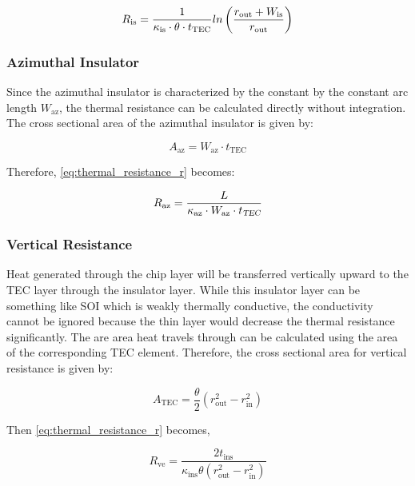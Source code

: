 \documentclass[10pt,a4paper,twocolumn]{article}
\begin{document}
\begin{equation}
	R_{\text{is}} = \frac{1}{\kappa_{\text{is}} \cdot \theta \cdot t_{\text{TEC}}} \\ln\left( \frac{r_{\text{out}} + W_{\text{is}}}{r_{\text{out}}} \right)
	\label{eq:radial_ins_resistance}
\end{equation}

\subsubsection{Azimuthal Insulator}

Since the azimuthal insulator is characterized by the constant by the constant arc length $W_{\text{az}}$, the thermal resistance can be calculated directly without integration. The cross sectional area of the azimuthal insulator is given by:

\begin{equation*}
	A_{\text{az}} = W_{\text{az}} \cdot t_{\text{TEC}}
\end{equation*}

Therefore, \cref{eq:thermal_resistance_r} becomes:

\begin{equation}
	R_{\text{az}} = \frac{L}{\kappa_{\text{az}} \cdot W_{\text{az}} \cdot t_{\textsl{TEC}}}
\end{equation}

\subsubsection{Vertical Resistance}

Heat generated through the chip layer will be transferred vertically upward to the TEC layer through the insulator layer. While this insulator layer can be something like SOI which is weakly thermally conductive, the conductivity cannot be ignored because the thin layer would decrease the thermal resistance significantly. The are area heat travels through can be calculated using the area of the corresponding TEC element. Therefore, the cross sectional area for vertical resistance is given by:

\begin{equation}
	A_{\text{TEC}} = \frac{\theta}{2} (r_{\text{out}}^2 - r_{\text{in}}^2)
	\label{eq:TEC_element_area}
\end{equation}

Then \cref{eq:thermal_resistance_r} becomes,

\begin{equation}
	R_{\text{ve}} = \frac{2 t_{\text{ins}}}{\kappa_{\text{ins}}\theta  \left(r_{\text{out}}^2 - r_{\text{in}}^2\right)}
\end{equation}
\end{document}
